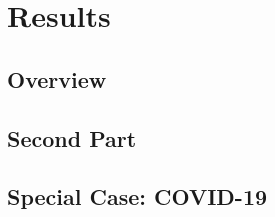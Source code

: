 \chapter{Results}


\graphicspath{{Chapter4/Figs/Vector/}{Chapter4/Figs/}}
\section{Overview}
\blindtext[3]

\section{Second Part}

\blindtext[3]
\section{Special Case: COVID-19}